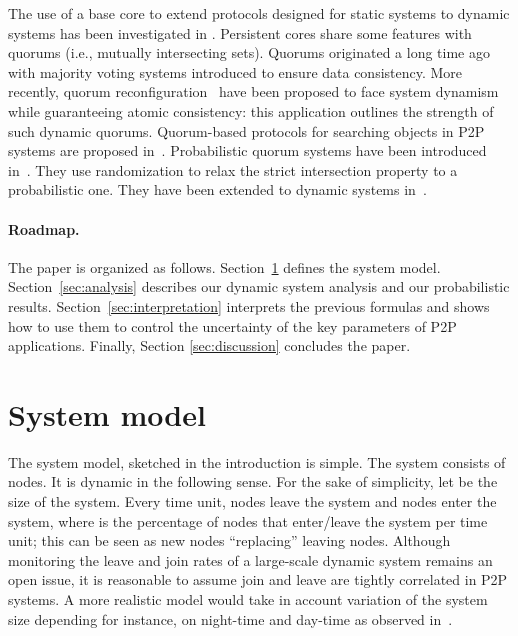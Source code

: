 \documentclass[]{llncs}
\begin{document}
The use of a base core to extend protocols designed for static systems to 
dynamic systems has been investigated in \cite{MRT05}. 
Persistent cores share some features with quorums (i.e., mutually 
intersecting sets). Quorums originated a  long time 
ago  with   majority   voting  systems \cite{G79,T79}  introduced to ensure
data   consistency.   
More recently, quorum reconfiguration~\cite{LS02,CGGMS05} have been proposed to face system dynamism while 
guaranteeing atomic consistency: this application outlines the strength of
such dynamic quorums.
Quorum-based  protocols for searching  objects in  P2P
systems  are proposed in~\cite{MTK06}.  Probabilistic  quorum  systems  
have been introduced in~\cite{MRWW01}.  They use randomization to
relax the strict intersection property to a probabilistic one.  They have
been extended to dynamic systems in~\cite{AM05}. 


\paragraph{Roadmap.}
The paper is organized as follows. 
Section~\ref{sec:model}
defines the system model. Section~\ref{sec:analysis} describes
our dynamic system analysis and our probabilistic results. 
Section~\ref{sec:interpretation} interprets the
previous formulas and shows how to use them  to  control
the uncertainty of the key parameters of P2P applications.  
Finally, Section \ref{sec:discussion} concludes the paper. 


\section{System model}
\label{sec:model}
The system model, sketched in the introduction is simple. 
The system consists of  nodes. It is dynamic in the following sense. 
For the sake of simplicity, let  be the size of the system.
Every time unit,   nodes leave the system and  
nodes enter the system, where  is the percentage of nodes that enter/leave
the system per time unit; this  can be seen as  new nodes ``replacing''
leaving nodes.  Although monitoring the leave and join rates of a large-scale 
dynamic system remains an open issue, it is reasonable to assume join and leave
are tightly correlated in P2P systems. 
A more realistic model would take in account variation of the system size 
depending for instance, on night-time and day-time as observed in~\cite{SGG02}.
\end{document}
